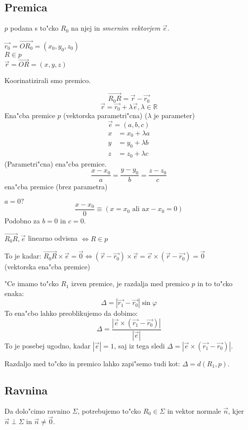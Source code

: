 \subsection{Premica}
$p$ podana s to"cko $R_0$ na njej in \emph{smernim vektorjem} $\vec{e}$.

$\vec{r_0} = \vec{OR_0} = (x_0, y_0, z_0)$\\
$R \in p$\\
$\vec{r} = \vec{OR} = (x, y, z)$

Koorinatizirali smo premico.

\[\vec{R_0R} = \vec{r} - \vec{r_0}\]
\[\vec{r} = \vec{r_0} + \lambda \vec{e}, \lambda \in \mathbb{R}\]
Ena"cba premice $p$ (vektorska parametri"cna) ($\lambda$ je parameter)
%
\[\vec{e} = (a, b, c)\]
\begin{align*}
	x &= x_0 + \lambda a\\
	y &= y_0 + \lambda b\\
	z &= z_0 + \lambda c
\end{align*}
(Parametri"cna) ena"cba premice.
%
\[
\frac{x - x_0}{a} = \frac{y - y_0}{b} = \frac{z - z_0}{c}
\]
ena"cba premice (brez parametra)

$a = 0 ?$
\[\frac{x - x_0}{0} \equiv (x = x_0 \text{ ali a} x - x_0 = 0)\]
Podobno za $b = 0$ in $c = 0$.

$\vec{R_0R}, \vec{e}$ linearno odvisna $\Leftrightarrow R \in p$

To je kadar: $\vec{R_0R} \times \vec{e} = \vec{0} \Leftrightarrow (\vec{r} - \vec{r_0}) \times \vec{e} = \vec{e} \times (\vec{r} - \vec{r_0}) = \vec{0}$\\
(vektorska ena"cba premice)

"Ce imamo to"cko $R_1$ izven premice, je razdalja med premico $p$ in to to"cko enaka:
\[
\Delta = |\vec{r_1} - \vec{r_0}| \sin \varphi
\]
To ena"cbo lahko preoblikujemo da dobimo:
\[
\Delta = \frac{|\vec{e} \times (\vec{r_1} - \vec{r_0})|}{|\vec{e}|}
\]
To je posebej ugodno, kadar $|\vec{e}| = 1$, saj iz tega sledi $\Delta = |\vec{e} \times (\vec{r_1} - \vec{r_0})|$.

Razdaljo med to"cko in premico lahko zapi"semo tudi kot: $\Delta = d(R_1, p)$.

\subsection{Ravnina}
Da dolo"cimo ravnino $\Sigma$, potrebujemo to"cko $R_0 \in \Sigma$ in vektor normale $\vec{n}$, kjer $\vec{n} \perp \Sigma$ in $\vec{n} \neq \vec{0}$.

